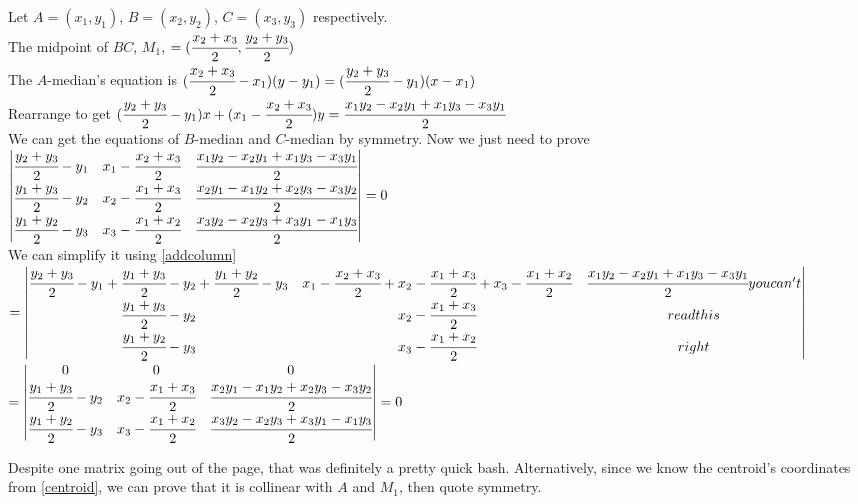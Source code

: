 \documentclass[11pt]{scrartcl}
\begin{document}
\begin{soln}
  Let $A=(x_1, y_1)$, $B=(x_2, y_2)$, $C=(x_3, y_3)$ respectively. \\
  The midpoint of $BC$, $M_1$, $=(\cfrac{x_2+x_3}{2}, \cfrac{y_2+y_3}{2})$ \\
  The $A$-median's equation is $(\cfrac{x_2+x_3}{2}-x_1)(y-y_1)=(\cfrac{y_2+y_3}{2}-y_1)(x-x_1)$\\
  Rearrange to get $(\cfrac{y_2+y_3}{2}-y_1)x+(x_1-\cfrac{x_2+x_3}{2})y=\cfrac{x_1y_2-x_2y_1+x_1y_3-x_3y_1}{2}$\\
  We can get the equations of $B$-median and $C$-median by symmetry. Now we just need to prove\\
  $\begin{vmatrix} 
  \cfrac{y_2+y_3}{2}-y_1 & x_1-\cfrac{x_2+x_3}{2} & \cfrac{x_1y_2-x_2y_1+x_1y_3-x_3y_1}{2} \\
  \cfrac{y_1+y_3}{2}-y_2 & x_2-\cfrac{x_1+x_3}{2} & \cfrac{x_2y_1-x_1y_2+x_2y_3-x_3y_2}{2} \\
  \cfrac{y_1+y_2}{2}-y_3 & x_3-\cfrac{x_1+x_2}{2} & \cfrac{x_3y_2-x_2y_3+x_3y_1-x_1y_3}{2} \\
  \end{vmatrix}=0$\\
  We can simplify it using \ref{addcolumn}\\
  $=\begin{vmatrix} 
  \cfrac{y_2+y_3}{2}-y_1+\cfrac{y_1+y_3}{2}-y_2+\cfrac{y_1+y_2}{2}-y_3 & x_1-\cfrac{x_2+x_3}{2}+x_2-\cfrac{x_1+x_3}{2}+x_3-\cfrac{x_1+x_2}{2} & \cfrac{x_1y_2-x_2y_1+x_1y_3-x_3y_1}{2}you can't \\
  \cfrac{y_1+y_3}{2}-y_2 & x_2-\cfrac{x_1+x_3}{2} & read this \\
  \cfrac{y_1+y_2}{2}-y_3 & x_3-\cfrac{x_1+x_2}{2} & right \\
  \end{vmatrix}$\\
  $=\begin{vmatrix} 
  0 & 0 & 0 \\
  \cfrac{y_1+y_3}{2}-y_2 & x_2-\cfrac{x_1+x_3}{2} & \cfrac{x_2y_1-x_1y_2+x_2y_3-x_3y_2}{2} \\
  \cfrac{y_1+y_2}{2}-y_3 & x_3-\cfrac{x_1+x_2}{2} & \cfrac{x_3y_2-x_2y_3+x_3y_1-x_1y_3}{2} \\
  \end{vmatrix}=0$\\  
\end{soln}
Despite one matrix going out of the page, that was definitely a pretty quick bash. Alternatively, since we know the centroid's coordinates from \ref{centroid}, we can prove that it is collinear with $A$ and $M_1$, then quote symmetry.
\end{document}
